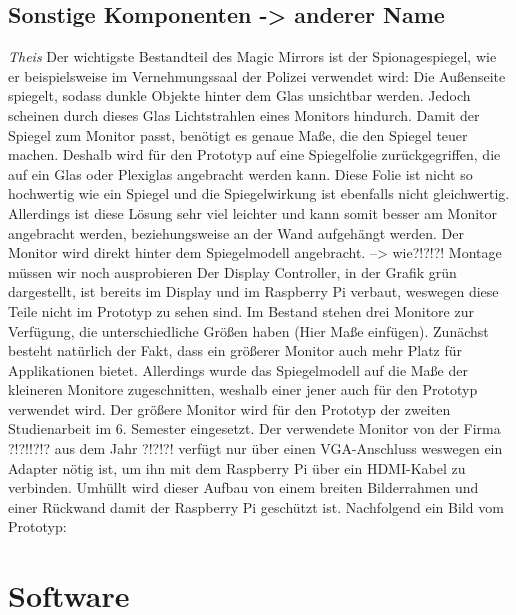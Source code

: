 \documentclass[12pt,a4paper]{report}
\begin{document}
\section{Sonstige Komponenten -> anderer Name}
\textit{Theis}
Der wichtigste Bestandteil des Magic Mirrors ist der Spionagespiegel, wie er beispielsweise im Vernehmungssaal der Polizei verwendet wird: Die Außenseite spiegelt, sodass dunkle Objekte hinter dem Glas unsichtbar werden. Jedoch scheinen durch dieses Glas Lichtstrahlen eines Monitors hindurch. Damit der Spiegel zum Monitor passt, benötigt es genaue Maße, die den Spiegel teuer machen. Deshalb wird für den Prototyp auf eine Spiegelfolie zurückgegriffen, die auf ein Glas oder Plexiglas angebracht werden kann. Diese Folie ist nicht so hochwertig wie ein Spiegel und die Spiegelwirkung ist ebenfalls nicht gleichwertig. Allerdings ist diese Lösung sehr viel leichter und kann somit besser am Monitor angebracht werden, beziehungsweise an der Wand aufgehängt werden. 
Der Monitor wird direkt hinter dem Spiegelmodell angebracht. --> wie?!?!?! Montage müssen wir noch ausprobieren
Der Display Controller, in der Grafik grün dargestellt, ist bereits im Display und im Raspberry Pi verbaut, weswegen diese Teile nicht im Prototyp zu sehen sind. 
Im Bestand stehen drei Monitore zur Verfügung, die unterschiedliche Größen haben (Hier Maße einfügen). Zunächst besteht natürlich der Fakt, dass ein größerer Monitor auch mehr Platz für Applikationen bietet. Allerdings wurde das Spiegelmodell auf die Maße der kleineren Monitore zugeschnitten, weshalb einer jener auch für den Prototyp verwendet wird. Der größere Monitor wird für den Prototyp der zweiten Studienarbeit im 6. Semester eingesetzt.
Der verwendete Monitor von der Firma ?!?!!?!? aus dem Jahr ?!?!?! verfügt nur über einen VGA-Anschluss weswegen ein Adapter nötig ist, um ihn mit dem Raspberry Pi über ein HDMI-Kabel zu verbinden. 
Umhüllt wird dieser Aufbau von einem breiten Bilderrahmen und einer Rückwand damit der Raspberry Pi geschützt ist. 
Nachfolgend ein Bild vom Prototyp:


\chapter{Software}
\end{document}
